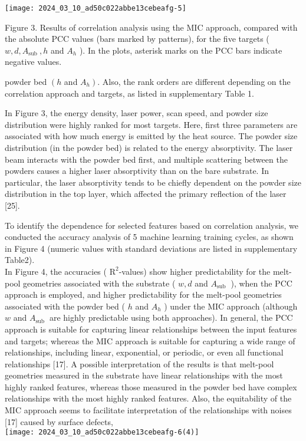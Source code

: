 \documentclass[10pt]{article}
\begin{document}
\begin{center}
\texttt{[image: 2024\_03\_10\_ad50c022abbe13cebeafg-5]}
\end{center}

Figure 3. Results of correlation analysis using the MIC approach, compared with the absolute PCC values (bars marked by patterns), for the five targets ( $w, d, A_{\text {sub }}, h$ and $A_{h}$ ). In the plots, asterisk marks on the PCC bars indicate negative values.

powder bed $\left(h\right.$ and $\left.A_{h}\right)$. Also, the rank orders are different depending on the correlation approach and targets, as listed in supplementary Table 1.

In Figure 3, the energy density, laser power, scan speed, and powder size distribution were highly ranked for most targets. Here, first three parameters are associated with how much energy is emitted by the heat source. The powder size distribution (in the powder bed) is related to the energy absorptivity. The laser beam interacts with the powder bed first, and multiple scattering between the powders causes a higher laser absorptivity than on the bare substrate. In particular, the laser absorptivity tends to be chiefly dependent on the powder size distribution in the top layer, which affected the primary reflection of the laser [25].

To identify the dependence for selected features based on correlation analysis, we conducted the accuracy analysis of 5 machine learning training cycles, as shown in Figure 4 (numeric values with standard deviations are listed in supplementary Table2).\\
In Figure 4, the accuracies ( $\mathrm{R}^{2}$-values) show higher predictability for the melt-pool geometries associated with the substrate ( $w, d$ and $A_{\text {sub }}$ ), when the PCC approach is employed, and higher predictability for the melt-pool geometries associated with the powder bed ( $h$ and $A_{h}$ ) under the MIC approach (although $w$ and $A_{\text {sub }}$ are highly predictable using both approaches). In general, the PCC approach is suitable for capturing linear relationships between the input features and targets; whereas the MIC approach is suitable for capturing a wide range of relationships, including linear, exponential, or periodic, or even all functional relationships [17]. A possible interpretation of the results is that melt-pool geometries measured in the substrate have linear relationships with the most highly ranked features, whereas those measured in the powder bed have complex relationships with the most highly ranked features. Also, the equitability of the MIC approach seems to facilitate interpretation of the relationships with noises [17] caused by surface defects,\\
\texttt{[image: 2024\_03\_10\_ad50c022abbe13cebeafg-6(4)]}
\end{document}
